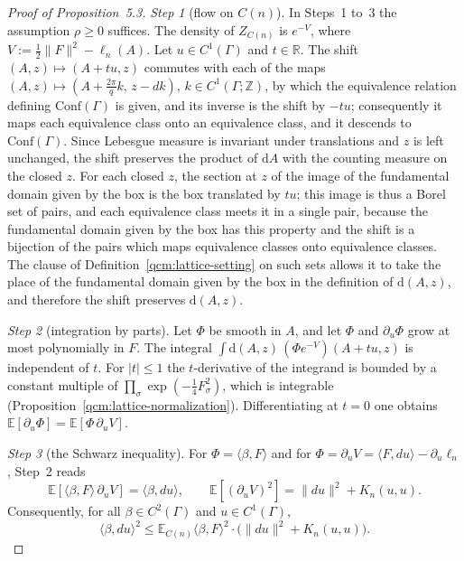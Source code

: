 \documentclass[11pt,letterpaper,reqno]{amsart}
\theoremstyle{definition}
\begin{document}
\begin{proof}[Proof of Proposition~5.3]
\emph{Step 1} (flow on $C(n)$).
In Steps~1 to~3 the assumption $\rho\ge0$ suffices.
The density of $Z_{C(n)}$ is $e^{-V}$, where $V:=\frac12\|F\|^2-\ell_n(A)$.
Let $u\in C^1(\Gamma)$ and $t\in\mathbb R$.
The shift $(A,z)\mapsto(A+tu,z)$ commutes with each of the maps $(A,z)\mapsto(A+\frac{2\pi}{q}k,\,z-dk)$, $k\in C^1(\Gamma;\mathbb Z)$, by which the equivalence relation defining $\mathrm{Conf}(\Gamma)$ is given, and its inverse is the shift by $-tu$;
consequently it maps each equivalence class onto an equivalence class, and it descends to $\mathrm{Conf}(\Gamma)$.
Since Lebesgue measure is invariant under translations and $z$ is left unchanged, the shift preserves the product of $\mathrm dA$ with the counting measure on the closed $z$.
For each closed $z$, the section at $z$ of the image of the fundamental domain given by the box is the box translated by $tu$;
this image is thus a Borel set of pairs, and each equivalence class meets it in a single pair, because the fundamental domain given by the box has this property and the shift is a bijection of the pairs which maps equivalence classes onto equivalence classes.
The clause of Definition~\ref{qcm:lattice-setting} on such sets allows it to take the place of the fundamental domain given by the box in the definition of $\mathrm d(A,z)$, and therefore the shift preserves $\mathrm d(A,z)$.

\emph{Step 2} (integration by parts).
Let $\Phi$ be smooth in $A$, and let $\Phi$ and $\partial_u\Phi$ grow at most polynomially in $F$.
The integral $\int\mathrm d(A,z)\,(\Phi e^{-V})(A+tu,z)$ is independent of $t$.
For $|t|\le1$ the $t$-derivative of the integrand is bounded by a constant multiple of $\prod_\sigma\exp(-\frac14F_\sigma^2)$, which is integrable (Proposition~\ref{qcm:lattice-normalization}).
Differentiating at $t=0$ one obtains $\mathbb E[\partial_u\Phi]=\mathbb E[\Phi\,\partial_uV]$.

\emph{Step 3} (the Schwarz inequality).
For $\Phi=\langle\beta,F\rangle$ and for $\Phi=\partial_uV=\langle F,du\rangle-\partial_u\ell_n$, Step~2 reads
\begin{equation*}
\mathbb E[\langle\beta,F\rangle\,\partial_uV]=\langle\beta,du\rangle,\qquad\mathbb E[(\partial_uV)^2]=\|du\|^2+K_n(u,u).
\end{equation*}
Consequently, for all $\beta\in C^2(\Gamma)$ and $u\in C^1(\Gamma)$,
\begin{equation*}
\langle\beta,du\rangle^2\le\mathbb E_{C(n)}\langle\beta,F\rangle^2\cdot\bigl(\|du\|^2+K_n(u,u)\bigr).
\end{equation*}


\end{proof}
\end{document}
